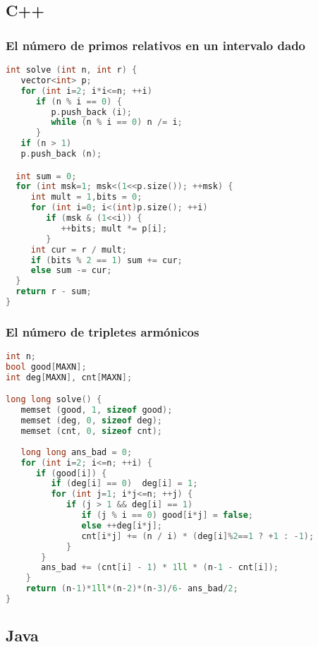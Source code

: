 \subsection{C++}

\subsubsection{El número de primos relativos en un intervalo dado}
\begin{lstlisting}[language=C++]
int solve (int n, int r) {
   vector<int> p;
   for (int i=2; i*i<=n; ++i)
      if (n % i == 0) {
         p.push_back (i);
	     while (n % i == 0) n /= i;
      }
   if (n > 1)
   p.push_back (n);

  int sum = 0;
  for (int msk=1; msk<(1<<p.size()); ++msk) {
     int mult = 1,bits = 0;
     for (int i=0; i<(int)p.size(); ++i)
        if (msk & (1<<i)) {
           ++bits; mult *= p[i];
        }
     int cur = r / mult;
     if (bits % 2 == 1) sum += cur;
     else sum -= cur;
  }
  return r - sum;
}
\end{lstlisting} 

\subsubsection{El número de tripletes armónicos}
\begin{lstlisting}[language=C++]
int n;
bool good[MAXN];
int deg[MAXN], cnt[MAXN];

long long solve() {
   memset (good, 1, sizeof good);
   memset (deg, 0, sizeof deg);
   memset (cnt, 0, sizeof cnt);
	
   long long ans_bad = 0;
   for (int i=2; i<=n; ++i) {
      if (good[i]) {
         if (deg[i] == 0)  deg[i] = 1;
         for (int j=1; i*j<=n; ++j) {
            if (j > 1 && deg[i] == 1)
               if (j % i == 0) good[i*j] = false;
               else ++deg[i*j];
               cnt[i*j] += (n / i) * (deg[i]%2==1 ? +1 : -1);
            }
       }
       ans_bad += (cnt[i] - 1) * 1ll * (n-1 - cnt[i]);
    }
	return (n-1)*1ll*(n-2)*(n-3)/6- ans_bad/2;
}
\end{lstlisting}


\subsection{Java}

